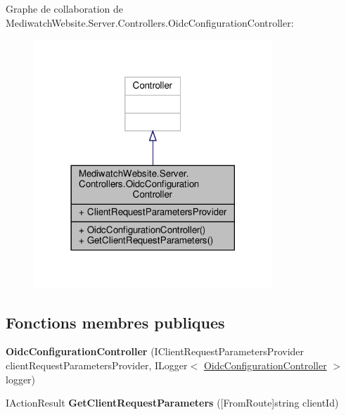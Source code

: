 Graphe de collaboration de Mediwatch\+Website.\+Server.\+Controllers.\+Oidc\+Configuration\+Controller\+:
\nopagebreak
\begin{figure}[H]
\begin{center}
\leavevmode
\includegraphics[width=254pt]{class_mediwatch_website_1_1_server_1_1_controllers_1_1_oidc_configuration_controller__coll__graph}
\end{center}
\end{figure}
\subsection*{Fonctions membres publiques}
\begin{DoxyCompactItemize}
\item 
\mbox{\label{class_mediwatch_website_1_1_server_1_1_controllers_1_1_oidc_configuration_controller_a8ba9e64456832ebf3dc0dbc74385affb}} 
{\bfseries Oidc\+Configuration\+Controller} (I\+Client\+Request\+Parameters\+Provider client\+Request\+Parameters\+Provider, I\+Logger$<$ \hyperlink{class_mediwatch_website_1_1_server_1_1_controllers_1_1_oidc_configuration_controller}{Oidc\+Configuration\+Controller} $>$ logger)
\item 
\mbox{\label{class_mediwatch_website_1_1_server_1_1_controllers_1_1_oidc_configuration_controller_afdb4efd2bdc21800cb6380cb1c8df1bf}} 
I\+Action\+Result {\bfseries Get\+Client\+Request\+Parameters} (\mbox{[}From\+Route\mbox{]}string client\+Id)
\end{DoxyCompactItemize}

